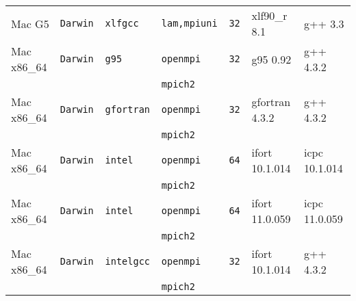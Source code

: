 \begin{tabular}{lllllll}
Mac G5                &\tt Darwin &\tt xlfgcc       &\tt lam,mpiuni &\tt 32              & xlf90\_r \footnotesize 8.1         & g++ \footnotesize 3.3           \\
Mac x86\_64           &\tt Darwin &\tt g95          &\tt openmpi    &\tt 32              & g95 \footnotesize 0.92             & g++ \footnotesize 4.3.2         \\
                      &           &                 &\tt mpich2     &                    &                                    &                                 \\
Mac x86\_64           &\tt Darwin &\tt gfortran     &\tt openmpi    &\tt 32              & gfortran \footnotesize 4.3.2       & g++ \footnotesize 4.3.2         \\
                      &           &                 &\tt mpich2     &                    &                                    &                                 \\
Mac x86\_64           &\tt Darwin &\tt intel        &\tt openmpi    &\tt 64              & ifort \footnotesize 10.1.014       & icpc \footnotesize 10.1.014     \\
                      &           &                 &\tt mpich2     &                    &                                    &                                 \\
Mac x86\_64           &\tt Darwin &\tt intel        &\tt openmpi    &\tt 64              & ifort \footnotesize 11.0.059       & icpc \footnotesize 11.0.059     \\
                      &           &                 &\tt mpich2     &                    &                                    &                                 \\
Mac x86\_64           &\tt Darwin &\tt intelgcc     &\tt openmpi    &\tt 32              & ifort \footnotesize 10.1.014       & g++ \footnotesize 4.3.2         \\
                      &           &                 &\tt mpich2     &                    &                                    &                                 \\

\end{tabular}
